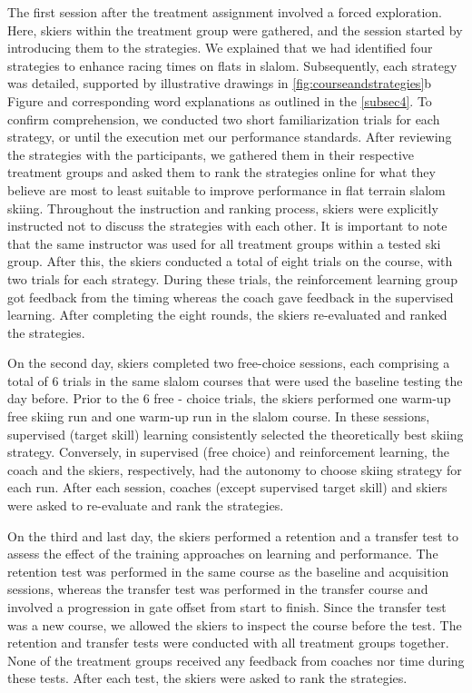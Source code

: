 \documentclass[pdflatex,sn-mathphys-num]{sn-jnl}%
\theoremstyle{thmstyleone}%
\theoremstyle{thmstyletwo}%
\theoremstyle{thmstylethree}%
\begin{document}
The first session after the treatment assignment involved a forced exploration. Here, skiers within the treatment group were gathered, and the session started by introducing them to the strategies. We explained that we had identified four strategies to enhance racing times on flats in slalom. Subsequently, each strategy was detailed, supported by illustrative drawings in \ref{fig:courseandstrategies}b Figure and corresponding word explanations as outlined in the \ref{subsec4}. To confirm comprehension, we conducted two short familiarization trials for each strategy, or until the execution met our performance standards. After reviewing the strategies with the participants, we gathered them in their respective treatment groups and asked them to rank the strategies online for what they believe are most to least suitable to improve performance in flat terrain slalom skiing. Throughout the instruction and ranking process, skiers were explicitly instructed not to discuss the strategies with each other. It is important to note that the same instructor was used for all treatment groups within a tested ski group. After this, the skiers conducted a total of eight trials on the course, with two trials for each strategy. During these trials, the reinforcement learning group got feedback from the timing whereas the coach gave feedback in the supervised learning. After completing the eight rounds, the skiers re-evaluated and ranked the strategies.

On the second day, skiers completed two free-choice sessions, each comprising a total of 6 trials in the same slalom courses that were used the baseline testing the day before. Prior to the 6 free - choice trials, the skiers performed one warm-up free skiing run and one warm-up run in the slalom course. In these sessions, supervised (target skill) learning consistently selected the theoretically best skiing strategy. Conversely, in supervised (free choice) and reinforcement learning, the coach and the skiers, respectively, had the autonomy to choose skiing strategy for each run. After each session, coaches (except supervised target skill) and skiers were asked to re-evaluate and rank the strategies.

On the third and last day, the skiers performed a retention and a transfer test to assess the effect of the training approaches on learning and performance. The retention test was performed in the same course as the baseline and acquisition sessions, whereas the transfer test was performed in the transfer course and involved a progression in gate offset from start to finish. Since the transfer test was a new course, we allowed the skiers to inspect the course before the test. The retention and transfer tests were conducted with all treatment groups together. None of the treatment groups received any feedback from coaches nor time during these tests. After each test, the skiers were asked to rank the strategies. 
\end{document}
